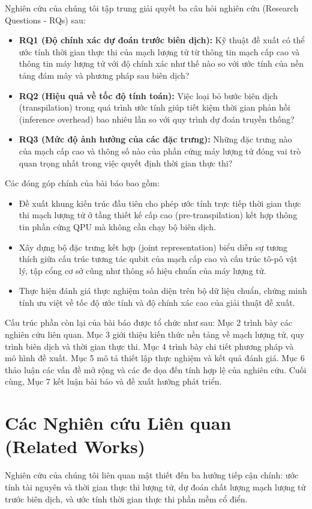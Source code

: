\documentclass[11pt, a4paper]{article}
\begin{document}
Nghiên cứu của chúng tôi tập trung giải quyết ba câu hỏi nghiên cứu (Research Questions - RQs) sau:
\begin{itemize}
    \item \textbf{RQ1 (Độ chính xác dự đoán trước biên dịch):} Kỹ thuật đề xuất có thể ước tính thời gian thực thi của mạch lượng tử từ thông tin mạch cấp cao và thông tin máy lượng tử với độ chính xác như thế nào so với ước tính của nền tảng đám mây và phương pháp sau biên dịch?
    \item \textbf{RQ2 (Hiệu quả về tốc độ tính toán):} Việc loại bỏ bước biên dịch (transpilation) trong quá trình ước tính giúp tiết kiệm thời gian phản hồi (inference overhead) bao nhiêu lần so với quy trình dự đoán truyền thống?
    \item \textbf{RQ3 (Mức độ ảnh hưởng của các đặc trưng):} Những đặc trưng nào của mạch cấp cao và thông số nào của phần cứng máy lượng tử đóng vai trò quan trọng nhất trong việc quyết định thời gian thực thi?
\end{itemize}

Các đóng góp chính của bài báo bao gồm:
\begin{itemize}
    \item Đề xuất khung kiến trúc đầu tiên cho phép ước tính trực tiếp thời gian thực thi mạch lượng tử ở tầng thiết kế cấp cao (pre-transpilation) kết hợp thông tin phần cứng QPU mà không cần chạy bộ biên dịch.
    \item Xây dựng bộ đặc trưng kết hợp (joint representation) biểu diễn sự tương thích giữa cấu trúc tương tác qubit của mạch cấp cao và cấu trúc tô-pô vật lý, tập cổng cơ sở cũng như thông số hiệu chuẩn của máy lượng tử.
    \item Thực hiện đánh giá thực nghiệm toàn diện trên bộ dữ liệu chuẩn, chứng minh tính ưu việt về tốc độ ước tính và độ chính xác cao của giải thuật đề xuất.
\end{itemize}

Cấu trúc phần còn lại của bài báo được tổ chức như sau: Mục 2 trình bày các nghiên cứu liên quan. Mục 3 giới thiệu kiến thức nền tảng về mạch lượng tử, quy trình biên dịch và thời gian thực thi. Mục 4 trình bày chi tiết phương pháp và mô hình đề xuất. Mục 5 mô tả thiết lập thực nghiệm và kết quả đánh giá. Mục 6 thảo luận các vấn đề mở rộng và các đe dọa đến tính hợp lệ của nghiên cứu. Cuối cùng, Mục 7 kết luận bài báo và đề xuất hướng phát triển.

\section{Các Nghiên cứu Liên quan (Related Works)}
Nghiên cứu của chúng tôi liên quan mật thiết đến ba hướng tiếp cận chính: ước tính tài nguyên và thời gian thực thi lượng tử, dự đoán chất lượng mạch lượng tử trước biên dịch, và ước tính thời gian thực thi phần mềm cổ điển.
\end{document}

